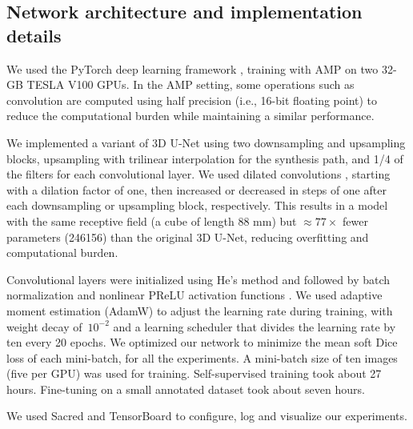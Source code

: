 \subsection{Network architecture and implementation details}

We used the PyTorch deep learning framework \cite{paszke_pytorch_2019}, training with \ac{AMP} on two 32-GB TESLA V100 \acp{GPU}.
In the \ac{AMP} setting, some operations such as convolution are computed using half precision (i.e., 16-bit floating point) to reduce the computational burden while maintaining a similar performance.

We implemented a variant of 3D U-Net \cite{cicek_3d_2016} using two downsampling and upsampling blocks, upsampling with trilinear interpolation for the synthesis path, and 1/4 of the filters for each convolutional layer.
We used dilated convolutions \cite{chen_deeplab_2017}, starting with a dilation factor of one, then increased or decreased in steps of one after each downsampling or upsampling block, respectively.
This results in a model with the same receptive field (a cube of length 88 mm) but $\approx 77 \times$ fewer parameters (\num{246156}) than the original 3D U-Net, reducing overfitting and computational burden.

Convolutional layers were initialized using He's method and followed by batch normalization and nonlinear PReLU activation functions \cite{ioffe_batch_2015,he_delving_2015}.
We used adaptive moment estimation (AdamW) \cite{kingma_adam_2014,loshchilov_decoupled_2019} to adjust the learning rate during training, with weight decay of~$10^{-2}$ and a learning scheduler that divides the learning rate by ten every 20 epochs.
We optimized our network to minimize the mean soft Dice loss \cite{milletari_v-net_2016} of each mini-batch, for all the experiments.
A mini-batch size of ten images (five per \ac{GPU}) was used for training.
Self-supervised training took about 27 hours.
Fine-tuning on a small annotated dataset took about seven hours.

We used Sacred \cite{greff_sacred_2017} and TensorBoard \cite{abadi_tensorflow_2016} to configure, log and visualize our experiments.
